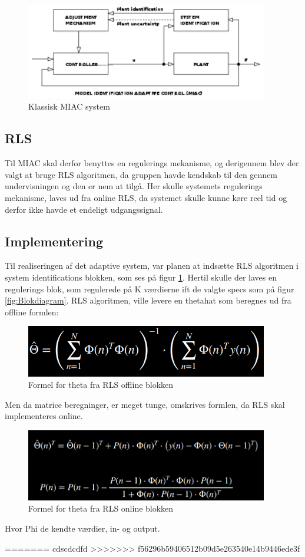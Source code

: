 \begin{figure}[H]
	\centering
	\includegraphics[width = 300pt]{figur/MIAC}
	\caption{Klassisk MIAC system}
	\label{fig:MIAC}
\end{figure}

\subsection{RLS}
Til MIAC skal derfor benyttes en regulerings mekanisme, og derigennem blev der valgt at bruge RLS algoritmen, da gruppen havde kendskab til den gennem undervisningen og den er nem at tilgå. Her skulle systemets regulerings mekanisme, laves ud fra online RLS, da systemet skulle kunne køre reel tid og derfor ikke havde et endeligt udgangssignal. 

\subsection{Implementering}
Til realiseringen af det adaptive system, var planen at indsætte RLS algoritmen i system identifications blokken, som ses på figur \ref{fig:MIAC}. Hertil skulle der laves en regulerings blok, som regulerede på K værdierne ift de valgte specs som på figur \ref{fig:Blokdiagram}.
RLS algoritmen, ville levere en thetahat som beregnes ud fra offline formlen:

\begin{figure}[H]
	\centering
	\includegraphics[width = 300pt]{figur/theta_formel}
	\caption{Formel for theta fra RLS offline blokken}
	\label{fig:theta_formel}
\end{figure}
Men da matrice beregninger, er meget tunge, omskrives formlen, da RLS skal implementeres online. 
 \begin{figure}[H]
	\centering
	\includegraphics[width = 300pt]{figur/RLS_formel}
	\caption{Formel for theta fra RLS online blokken}
	\label{fig:RLS_formel}
\end{figure}
Hvor Phi de kendte værdier, in- og output. 
     
=======
cdscdcdfd
>>>>>>> f56296b59406512b09d5e263540e14b9446ede3f
